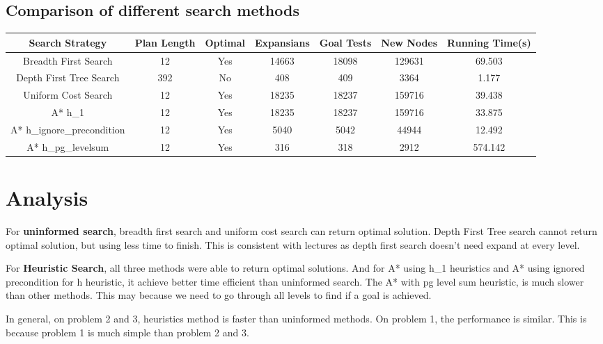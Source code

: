 \documentclass[]{article}
\begin{document}
\subsection*{Comparison of different search methods}
\begin{table}
	\begin{center}
		\begin{adjustbox}{width=1\textwidth}
			\begin{tabular}{ c | c | c | c | c | c | c }
				\hline
				Search Strategy & Plan Length & Optimal & Expansians & Goal Tests & New Nodes & Running Time(s) \\ \hline
				Breadth First Search & 12 & Yes &  14663 & 18098 & 129631 & 69.503 \\ \hline
				Depth First Tree Search & 392 & No &  408 & 409 & 3364 & 1.177 \\ \hline
				Uniform Cost Search & 12 & Yes &  18235 & 18237 & 159716 & 39.438 \\ \hline
				A* h\_1 & 12 & Yes &  18235 & 18237 & 159716 & 33.875 \\ \hline
				A* h\_ignore\_precondition & 12 & Yes &  5040 & 5042 & 44944 & 12.492 \\ \hline
				A* h\_pg\_levelsum & 12 & Yes &  316 & 318 & 2912 & 574.142\\
				\hline
			\end{tabular}
		\end{adjustbox}
	\end{center}
\end{table}


\section{Analysis}
For \textbf{uninformed search}, breadth first search and uniform cost search can return optimal solution. Depth First Tree search cannot return optimal solution, but using less time to finish. This is consistent with lectures as depth first search doesn't need expand at every level.

For \textbf{Heuristic Search}, all three methods were able to return optimal solutions. And for A* using h\_1 heuristics and A* using ignored precondition for h heuristic, it achieve better time efficient than uninformed search. The A* with pg level sum heuristic, is much slower than other methods. This may because we need to go through all levels to find if a goal is achieved.

In general, on problem 2 and 3, heuristics method is faster than uninformed methods. On problem 1, the performance is similar. This is because problem 1 is much simple than problem 2 and 3.
\end{document}
